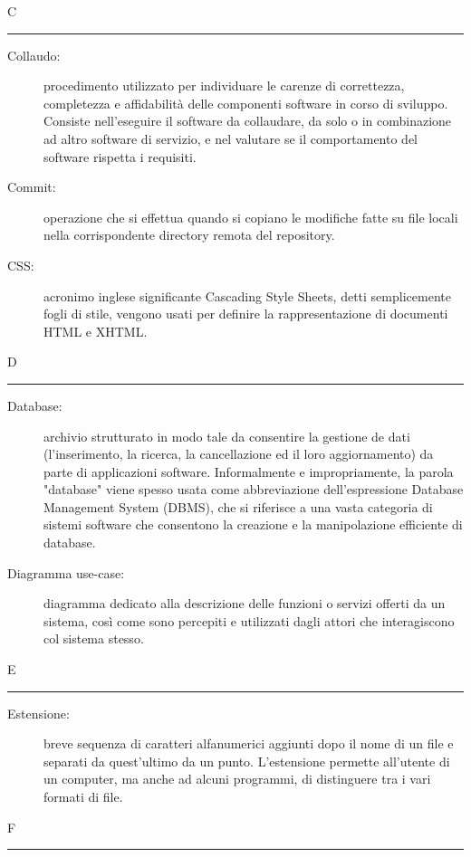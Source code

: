 \documentclass[11pt,a4paper]{article}
\begin{document}
\bigskip
\Huge C \bigskip
\hrule
\smallskip
\normalsize
\begin{description}
	\item[Collaudo:] procedimento utilizzato per individuare le carenze di correttezza, completezza e affidabilità delle componenti software in corso di sviluppo. Consiste nell'eseguire il software da collaudare, da solo o in combinazione ad altro software di servizio, e nel valutare se il comportamento del software rispetta i requisiti.
	\item[Commit:] operazione che si effettua quando si copiano le modifiche fatte su file locali nella corrispondente directory remota del repository.
	\item[CSS:] acronimo inglese significante Cascading Style Sheets, detti semplicemente fogli di stile, vengono usati per definire la rappresentazione di documenti HTML e XHTML.
\end{description}
\bigskip
\Huge D \bigskip
\hrule
\smallskip
\normalsize
\begin{description}
	\item[Database:] archivio strutturato in modo tale da consentire la gestione de dati (l'inserimento, la ricerca, la cancellazione ed il loro aggiornamento) da parte di applicazioni software. Informalmente e impropriamente, la parola "database" viene spesso usata come abbreviazione dell'espressione Database Management System (DBMS), che si riferisce a una vasta categoria di sistemi software che consentono la creazione e la manipolazione efficiente di database.
	\item[Diagramma use-case:] diagramma dedicato alla descrizione delle funzioni o servizi offerti da un sistema, così come sono percepiti e utilizzati dagli attori che interagiscono col sistema stesso.
\end{description}
\bigskip
\Huge E \bigskip
\hrule
\smallskip
\normalsize
\begin{description}
	\item[Estensione:] breve sequenza di caratteri alfanumerici aggiunti dopo il nome di un file e separati da quest'ultimo da un punto. L'estensione permette all'utente di un computer, ma anche ad alcuni programmi, di distinguere tra i vari formati di file.
\end{description}
\bigskip
\Huge F \bigskip
\hrule
\smallskip
\normalsize
\end{document}
